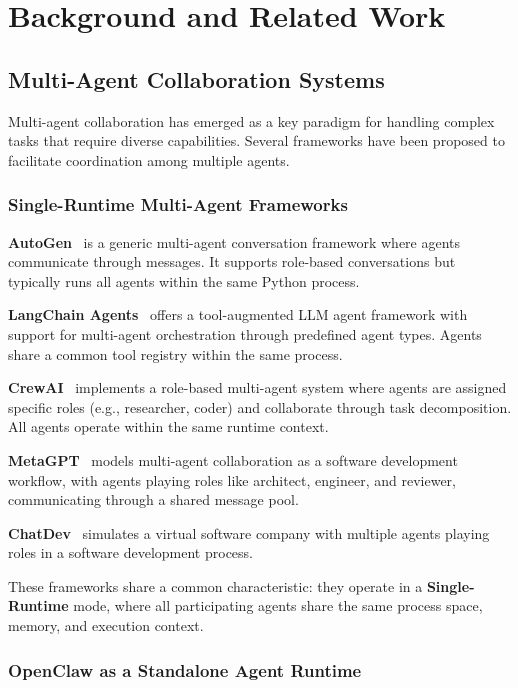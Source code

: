 \section{Background and Related Work}
\label{sec:background}

\subsection{Multi-Agent Collaboration Systems}

Multi-agent collaboration has emerged as a key paradigm for handling complex tasks that require diverse capabilities. Several frameworks have been proposed to facilitate coordination among multiple agents.

\subsubsection{Single-Runtime Multi-Agent Frameworks}

\textbf{AutoGen}~\citep{wu2023autogen} is a generic multi-agent conversation framework where agents communicate through messages. It supports role-based conversations but typically runs all agents within the same Python process.

\textbf{LangChain Agents}~\citep{langchain} offers a tool-augmented LLM agent framework with support for multi-agent orchestration through predefined agent types. Agents share a common tool registry within the same process.

\textbf{CrewAI}~\citep{crewai} implements a role-based multi-agent system where agents are assigned specific roles (e.g., researcher, coder) and collaborate through task decomposition. All agents operate within the same runtime context.

\textbf{MetaGPT}~\citep{hong2024metagpt} models multi-agent collaboration as a software development workflow, with agents playing roles like architect, engineer, and reviewer, communicating through a shared message pool.

\textbf{ChatDev}~\citep{qian2024chatdev} simulates a virtual software company with multiple agents playing roles in a software development process.

These frameworks share a common characteristic: they operate in a \textbf{Single-Runtime} mode, where all participating agents share the same process space, memory, and execution context.

\subsubsection{OpenClaw as a Standalone Agent Runtime}

